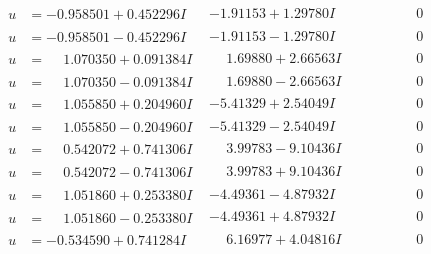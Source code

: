 \documentclass[1p]{elsarticle_modified}
\theoremstyle{definition}
\begin{document}
$$\begin{array}{c|c|c}
\begin{aligned}
u &= -0.958501 + 0.452296 I\end{aligned}
 & -1.91153 + 1.29780 I & \phantom{-0.000000 } 0 \\ \hline\begin{aligned}
u &= -0.958501 - 0.452296 I\end{aligned}
 & -1.91153 - 1.29780 I & \phantom{-0.000000 } 0 \\ \hline\begin{aligned}
u &= \phantom{-}1.070350 + 0.091384 I\end{aligned}
 & \phantom{-}1.69880 + 2.66563 I & \phantom{-0.000000 } 0 \\ \hline\begin{aligned}
u &= \phantom{-}1.070350 - 0.091384 I\end{aligned}
 & \phantom{-}1.69880 - 2.66563 I & \phantom{-0.000000 } 0 \\ \hline\begin{aligned}
u &= \phantom{-}1.055850 + 0.204960 I\end{aligned}
 & -5.41329 + 2.54049 I & \phantom{-0.000000 } 0 \\ \hline\begin{aligned}
u &= \phantom{-}1.055850 - 0.204960 I\end{aligned}
 & -5.41329 - 2.54049 I & \phantom{-0.000000 } 0 \\ \hline\begin{aligned}
u &= \phantom{-}0.542072 + 0.741306 I\end{aligned}
 & \phantom{-}3.99783 - 9.10436 I & \phantom{-0.000000 } 0 \\ \hline\begin{aligned}
u &= \phantom{-}0.542072 - 0.741306 I\end{aligned}
 & \phantom{-}3.99783 + 9.10436 I & \phantom{-0.000000 } 0 \\ \hline\begin{aligned}
u &= \phantom{-}1.051860 + 0.253380 I\end{aligned}
 & -4.49361 - 4.87932 I & \phantom{-0.000000 } 0 \\ \hline\begin{aligned}
u &= \phantom{-}1.051860 - 0.253380 I\end{aligned}
 & -4.49361 + 4.87932 I & \phantom{-0.000000 } 0 \\ \hline\begin{aligned}
u &= -0.534590 + 0.741284 I\end{aligned}
 & \phantom{-}6.16977 + 4.04816 I & \phantom{-0.000000 } 0 \\ \hline\begin{aligned}

\end{aligned}
\end{array}$$
\end{document}
